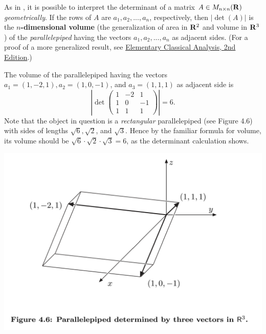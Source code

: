 \begin{remark}
As in , it is possible to interpret the determinant of a matrix \(A \in M_{n \times n}(\mathbf{R})\) \emph{geometrically}.
If the rows of \(A\) are \(a_1, a_2, ..., a_{n}\), respectively,
then \(\left| \det(A) \right|\) is the \textbf{\(n\)-dimensional volume} (the generalization of area in \(\mathbf{R}^2\) and volume in \(\mathbf{R}^3\)) of the \emph{parallelepiped} having the vectors \(a_1, a_2, ..., a_n\) as adjacent sides.
(For a proof of a more generalized result, see \href{https://www.amazon.com/-/zh_TW/Jerrold-Marsden/dp/0716721058/ref=sr_1_1}{Elementary Classical Analysis, 2nd Edition}.)
\end{remark}

\begin{example} \label{example 4.3.2}
The volume of the parallelepiped having the vectors \(a_1 = (1, -2, 1), a_2 = (1, 0, -1)\), and \(a_3 = (1, 1, 1)\) as adjacent side is
\[
    \left|
        \det \begin{pmatrix}
            1 & -2 & 1 \\
            1 & 0 & -1 \\
            1 & 1 & 1
        \end{pmatrix}
    \right| = 6.
\]
Note that the object in question is a \emph{rectangular} parallelepiped (see Figure 4.6) with sides of lengths \(\sqrt{6}, \sqrt{2}\), and \(\sqrt{3}\).
Hence by the familiar formula for volume, its volume should be \(\sqrt{6} \cdot \sqrt{2} \cdot \sqrt{3} = 6\), as the determinant calculation shows.
\end{example}

\includegraphics[width=16cm]{images/figure-4-6.png}

